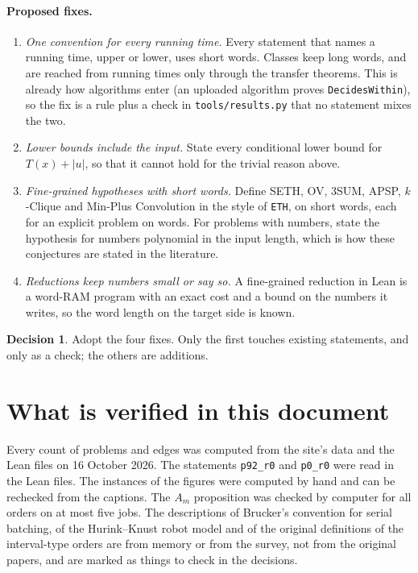 \documentclass[11pt]{article}
\newcommand{\lean}[1]{\texttt{#1}}
\theoremstyle{definition}
\newtheorem{decision}{Decision}
\begin{document}
\paragraph{Proposed fixes.}
\begin{enumerate}[leftmargin=*]
\item \emph{One convention for every running time.} Every statement that names
a running time, upper or lower, uses short words. Classes keep long words, and
are reached from running times only through the transfer theorems. This is
already how algorithms enter (an uploaded algorithm proves
\lean{DecidesWithin}), so the fix is a rule plus a check in
\lean{tools/results.py} that no statement mixes the two.
\item \emph{Lower bounds include the input.} State every conditional lower
bound for $T(x)+|u|$, so that it cannot hold for the trivial reason above.
\item \emph{Fine-grained hypotheses with short words.} Define SETH, OV, 3SUM,
APSP, $k$-Clique and Min-Plus Convolution in the style of \lean{ETH}, on short
words, each for an explicit problem on words. For problems with numbers, state
the hypothesis for numbers polynomial in the input length, which is how
these conjectures are stated in the literature.
\item \emph{Reductions keep numbers small or say so.} A fine-grained reduction
in Lean is a word-RAM program with an exact cost and a bound on the numbers
it writes, so the word length on the target side is known.
\end{enumerate}

\begin{decision}
Adopt the four fixes. Only the first touches existing statements, and only as a
check; the others are additions.
\end{decision}

\section*{What is verified in this document}

Every count of problems and edges was computed from the site's data and the
Lean files on 16 October 2026. The statements \lean{p92\_r0} and
\lean{p0\_r0} were read in the Lean files. The instances of the figures were
computed by hand and can be rechecked from the captions. The $A_m$ proposition
was checked by computer for all orders on at most five jobs. The descriptions
of Brucker's convention for serial batching, of the Hurink--Knust robot model
and of the original definitions of the interval-type orders are from memory or
from the survey, not from the original papers, and are marked as things to
check in the decisions.
\end{document}

